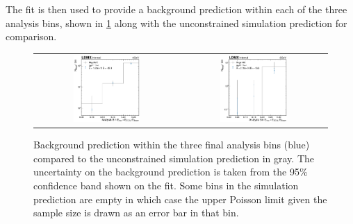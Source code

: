 The fit is then used to provide a background prediction within each of the three analysis bins,
shown in \cref{fig:bkgd-pred} along with the unconstrained simulation prediction for comparison.

\begin{figure}[htb]
  \centering
  \begin{tabular}{cc}
    \includegraphics[width=0.48\textwidth]{figures/ldmx/analysis/4gev-integrated-bkgd-fit.pdf}
    &
    \includegraphics[width=0.48\textwidth]{figures/ldmx/analysis/8gev-integrated-bkgd-fit.pdf}
  \end{tabular}
  \caption{%
    Background prediction within the three final analysis bins (blue)
    compared to the unconstrained simulation prediction in gray.
    The uncertainty on the background prediction is taken from the 95\% confidence band
    shown on the fit.
    Some bins in the simulation prediction are empty in which case the upper Poisson limit
    given the sample size is drawn as an error bar in that bin.
  }
  \label{fig:bkgd-pred}
\end{figure}

